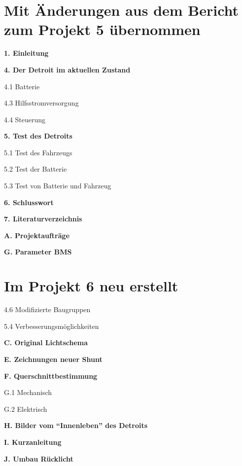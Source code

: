 \section*{Mit Änderungen aus dem Bericht zum Projekt 5 übernommen}
\begin{compactitem}
\item \textbf{1. Einleitung}
\item \textbf{4. Der Detroit im aktuellen Zustand}
\item 4.1 Batterie
\item 4.3 Hilfsstromversorgung
\item 4.4 Steuerung
\item \textbf{5. Test des Detroits}
\item 5.1 Test des Fahrzeugs
\item 5.2 Test der Batterie
\item 5.3 Test von Batterie und Fahrzeug
\item \textbf{6. Schlusswort}
\item \textbf{7. Literaturverzeichnis}
\item \textbf{A. Projektaufträge}
\item \textbf{G. Parameter BMS}
\end{compactitem}

\section*{Im Projekt 6 neu erstellt}
\begin{compactitem}
\item 4.6 Modifizierte Baugruppen
\item 5.4 Verbesserungsmöglichkeiten
\item \textbf{C. Original Lichtschema}
\item \textbf{E. Zeichnungen neuer Shunt}
\item \textbf{F. Querschnittbestimmung}
\item G.1 Mechanisch
\item G.2 Elektrisch
\item \textbf{H. Bilder vom "`Innenleben"' des Detroits}
\item \textbf{I. Kurzanleitung}
\item \textbf{J. Umbau Rücklicht}
\end{compactitem}